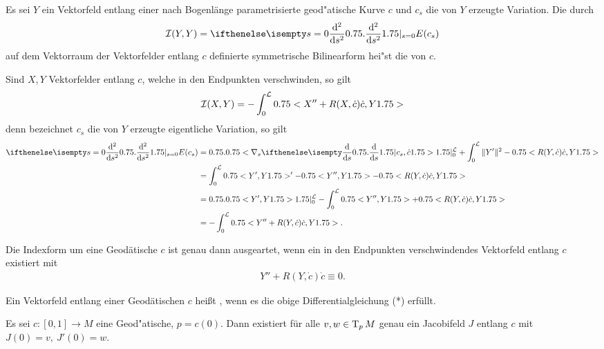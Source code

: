 \begin{Dfn}
  Es sei $Y$ ein Vektorfeld entlang einer nach Bogenlänge parametrisierte geod"atische Kurve $c$ und $c_s$ die von $Y$ erzeugte Variation. Die durch
  \begin{align*}
    \calI(Y,Y) = \difffrac[s=0]{^2}{s^2} E(c_s)
  \end{align*}
  auf dem Vektorraum der Vektorfelder entlang $c$ definierte symmetrische Bilinearform hei"st die  von $c$.
\end{Dfn}

Sind $X,Y$ Vektorfelder entlang $c$, welche in den Endpunkten
verschwinden, so gilt
\begin{align*}
  \operatorname{\mathcal{I}}(X,Y) = -\int_0^{\mathcal L}0.75<X'' + R(X,\dot c)\dot
    c,Y1.75>
\end{align*}
denn bezeichnet $c_s$ die von $Y$ erzeugte eigentliche Variation, so
gilt
\begin{align*}
  \difffrac[s=0]{^2}{s^2}E(c_s) & = \left.\left<\nabla_s\difffrac{}{s}c_s,\dot c\right>\right|_0^{\mathcal L} + \int_0^{\mathcal L}\|Y'\|^2 - \left<R(Y,\dot c)\dot c,Y\right>\\
  & = \int_0^{\mathcal L}\left<Y',Y\right>' - \left<Y'',Y\right> - \left<R(Y,\dot c)\dot c,Y\right>\\
  & = \left.\left<Y',Y\right>\right|_0^{\mathcal L} - \int_0^{\mathcal L} \left<Y'',Y\right> + \left<R(Y,\dot c)\dot c,Y\right>\\
  & = - \int_0^{\mathcal L}\left<Y'' + R(Y,\dot c) \dot c, Y\right>.
\end{align*}

Die Indexform um eine Geodätische $c$ ist genau dann ausgeartet, wenn ein in den Endpunkten verschwindendes Vektorfeld entlang $c$ existiert mit
\begin{align*}
  Y'' + R(Y,\dot c) \dot c \equiv 0. \tag{*}
\end{align*}

\begin{Dfn}
  Ein Vektorfeld entlang einer Geodätischen $c$ heißt , wenn es die obige Differentialgleichung (*) erfüllt.
\end{Dfn}

\begin{Lemma}\label{thm:lemma-9-4}
  Es sei $c \colon [0,1] \to M$ eine Geod"atische, $p = c(0)$.
  Dann existiert für alle $v,w \in \operatorname{T}_pM$ genau ein Jacobifeld $J$ entlang $c$ mit $J(0) = v, \ J'(0) = w$.
\end{Lemma}

